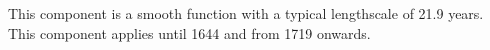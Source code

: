 This component is a smooth function with a typical lengthscale of 21.9 years.
This component applies until 1644 and from 1719 onwards.